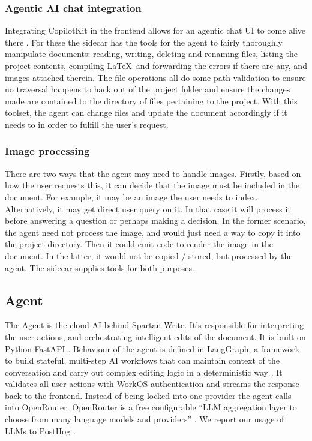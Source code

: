 \subsubsection{Agentic AI chat integration}
Integrating CopilotKit in the frontend allows for an agentic chat UI to come alive there \cite{copilotkit}.
For these the sidecar has the tools for the agent to fairly thoroughly manipulate documents: reading, writing, deleting and renaming files, listing the project contents, compiling \LaTeX\ and forwarding the errors if there are any, and images attached therein.
The file operations all do some path validation to ensure no traversal happens to hack out of the project folder and ensure the changes made are contained to the directory of files pertaining to the project.
With this toolset, the agent can change files and update the document accordingly if it needs to in order to fulfill the user's request.

\subsubsection{Image processing}
There are two ways that the agent may need to handle images.
Firstly, based on how the user requests this, it can decide that the image must be included in the document.
For example, it may be an image the user needs to index.
Alternatively, it may get direct user query on it.
In that case it will process it before answering a question or perhaps making a decision.
In the former scenario, the agent need not process the image, and would just need a way to copy it into the project directory.
Then it could emit code to render the image in the document.
In the latter, it would not be copied / stored, but processed by the agent.
The sidecar supplies tools for both purposes.

\subsection{Agent}
The Agent is the cloud AI behind Spartan Write.
It's responsible for interpreting the user actions, and orchestrating intelligent edits of the document.
It is built on Python FastAPI \cite{fastapi}.
Behaviour of the agent is defined in LangGraph, a framework to build stateful, multi-step AI workflows that can maintain context of the conversation and carry out complex editing logic in a deterministic way \cite{langgraph}.
It validates all user actions with WorkOS authentication \cite{workos} and streams the response back to the frontend.
Instead of being locked into one provider the agent calls into OpenRouter.
OpenRouter is a free configurable “LLM aggregation layer to choose from many language models and providers” \cite{openrouter}.
We report our usage of LLMs to PostHog \cite{posthog}.

